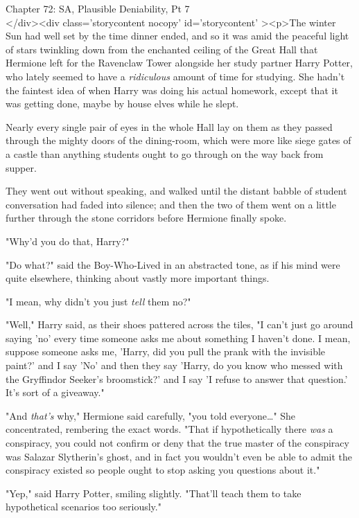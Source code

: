 
Chapter 72: SA, Plausible Deniability, Pt 7\\
</div><div  class='storycontent nocopy' id='storycontent' ><p>The winter Sun 
had well set by the time dinner ended, and so it was amid the peaceful light of 
stars twinkling down from the enchanted ceiling of the Great Hall that Hermione 
left for the Ravenclaw Tower alongside her study partner Harry Potter, who 
lately seemed to have a \emph{ridiculous} amount of time for studying. She 
hadn't the faintest idea of when Harry was doing his actual homework, except 
that it was getting done, maybe by house elves while he slept.

Nearly every single pair of eyes in the whole Hall lay on them as they passed 
through the mighty doors of the dining-room, which were more like siege gates 
of a castle than anything students ought to go through on the way back from 
supper.

They went out without speaking, and walked until the distant babble of student 
conversation had faded into silence; and then the two of them went on a little 
further through the stone corridors before Hermione finally spoke.

"Why'd you do that, Harry?"

"Do what?" said the Boy-Who-Lived in an abstracted tone, as if his mind were 
quite elsewhere, thinking about vastly more important things.

"I mean, why didn't you just \emph{tell} them no?"

"Well," Harry said, as their shoes pattered across the tiles, "I can't just go 
around saying 'no' every time someone asks me about something I haven't done. I 
mean, suppose someone asks me, 'Harry, did you pull the prank with the 
invisible paint?' and I say 'No' and then they say 'Harry, do you know who 
messed with the Gryffindor Seeker's broomstick?' and I say 'I refuse to answer 
that question.' It's sort of a giveaway."

"And \emph{that's} why," Hermione said carefully, "you told everyone{\ldots}" 
She concentrated, rembering the exact words. "That if hypothetically there 
\emph{was} a conspiracy, you could not confirm or deny that the true master of 
the conspiracy was Salazar Slytherin's ghost, and in fact you wouldn't even be 
able to admit the conspiracy existed so people ought to stop asking you 
questions about it."

"Yep," said Harry Potter, smiling slightly. "That'll teach them to take 
hypothetical scenarios too seriously."

